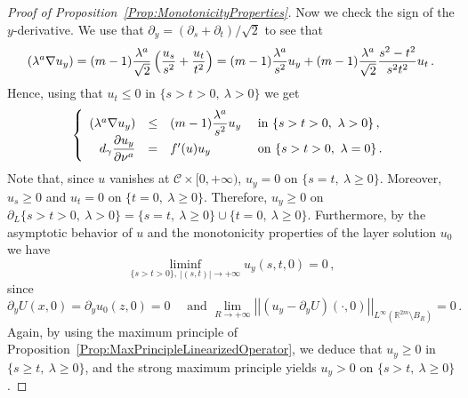 \documentclass[twoside,leqno,symbols-for-thanks, draft]{rmi}
\numberwithin{equation}{section}
\theoremstyle{definition}
\newcommand{\con}[1]{\mathbb{#1}}
\newcommand{\R}{\con{R}} %
\newcommand{\ccal}{\mathscr{C}}
\newcommand{\norm}[1]{\left | \left |{#1} \right | \right |}
\newcommand{\s}{\gamma}
\newcommand{\bpar}[1]{\left ( {#1}\right )}
\newcommand\beqc[1]{\left\{\begin{array}{#1}}
\newcommand\eeqc{\end{array} \right.}
\def\PDEsystem{rcll}
\let\div\relax
\DeclareMathOperator{\div}{div}
\begin{document}
\begin{proof}[Proof of Proposition~\ref{Prop:MonotonicityProperties}]
	Now we check the sign of the $y$-derivative. We use that $\partial_y = (\partial_s + \partial_t)/\sqrt{2}$ to see that
	$$
	\div (\lambda^a \nabla u_y) = (m-1) \dfrac{\lambda^a}{\sqrt{2}}\bpar{ \dfrac{u_s}{s^2} + \dfrac{u_t}{t^2} } = (m-1) \dfrac{\lambda^a}{s^2} u_y + (m-1) \dfrac{\lambda^a}{\sqrt{2}} \dfrac{s^2 - t^2}{s^2t^2} u_t \, . 
	$$
	Hence, using that $u_t \leq 0$ in $ \{ s > t>0,\ \lambda > 0\} $ we get
	$$
	\beqc{\PDEsystem}
	\div (\lambda^a \nabla u_y) &\leq & (m-1) \dfrac{\lambda^a}{s^2} u_y & \text{ in } \{ s > t > 0 ,\ \lambda > 0\}\,, \\
	d_\s \dfrac{\partial u_y}{\partial \nu^a}& = & f'(u)u_y& \text{ on }  \{ s > t > 0 , \ \lambda = 0\}\,.
	\eeqc
	$$
	Note that, since $u$ vanishes at $\ccal \times [0, +\infty)$, $u_y = 0$ on $\{ s=t, \ \lambda \geq 0\}$. Moreover, $u_s\geq 0$ and $u_t = 0$ on $\{t=0, \ \lambda \geq 0\}$. Therefore, $u_y \geq 0$ on $\partial_L \{ s > t > 0 ,\ \lambda > 0\} = \{s = t,\ \lambda \geq 0 \}\cup \{t=0, \ \lambda \geq 0\}$. Furthermore, by the asymptotic behavior of $u$ and the monotonicity properties of the layer solution $u_0$ we have
	$$
	\liminf_{\{s> t>0\} ,\ |(s,t)|\to +\infty}  u_y(s,t,0) = 0\,,
	$$
	since
	$$
	\partial_y U (x,0) = \partial_y u_0(z,0)=  0 \quad \text{ and } \lim_{R\to +\infty} \norm{(u_y - \partial_y U) (\cdot,0) }_{L^\infty(\R^{2m}\setminus B_{R})} = 0\,.
	$$
	Again, by using the maximum principle of Proposition~\ref{Prop:MaxPrincipleLinearizedOperator}, we deduce that $u_y \geq 0$ in $\{ s \geq t,\ \lambda \geq 0\}$, and the strong maximum principle yields $u_y > 0$ on $\{ s > t,\ \lambda \geq 0\}$.
	

\end{proof}
\end{document}
